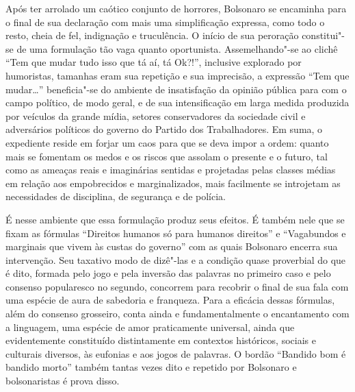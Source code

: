 Após ter arrolado um caótico conjunto de horrores, Bolsonaro se
encaminha para o final de sua declaração com mais uma simplificação
expressa, como todo o resto, cheia de fel, indignação e truculência. O
início de sua peroração constitui"-se de uma formulação tão vaga quanto
oportunista. Assemelhando"-se ao clichê ``Tem que mudar tudo isso que tá
aí, tá Ok?!'', inclusive explorado por humoristas, tamanhas eram sua
repetição e sua imprecisão, a expressão ``Tem que mudar\ldots{}''
beneficia"-se do ambiente de insatisfação da opinião pública para com o
campo político, de modo geral, e de sua intensificação em larga medida
produzida por veículos da grande mídia, setores conservadores da
sociedade civil e adversários políticos do governo do Partido dos
Trabalhadores. Em suma, o expediente reside em forjar um caos para que
se deva impor a ordem: quanto mais se fomentam os medos e os riscos que
assolam o presente e o futuro, tal como as ameaças reais e imaginárias
sentidas e projetadas pelas classes médias em relação aos empobrecidos e
marginalizados, mais facilmente se introjetam as necessidades de
disciplina, de segurança e de polícia.

É nesse ambiente que essa formulação produz seus efeitos. É também nele
que se fixam as fórmulas ``Direitos humanos só para humanos direitos'' e
``Vagabundos e marginais que vivem às custas do governo'' com as quais
Bolsonaro encerra sua intervenção. Seu taxativo modo de dizê"-las e a
condição quase proverbial do que é dito, formada pelo jogo e pela
inversão das palavras no primeiro caso e pelo consenso popularesco no
segundo, concorrem para recobrir o final de sua fala com uma espécie de
aura de sabedoria e franqueza. Para a eficácia dessas fórmulas, além do
consenso grosseiro, conta ainda e fundamentalmente o encantamento com a
linguagem, uma espécie de amor praticamente universal, ainda que
evidentemente constituído distintamente em contextos históricos, sociais
e culturais diversos, às eufonias e aos jogos de palavras. O bordão
``Bandido bom é bandido morto'' também tantas vezes dito e repetido por
Bolsonaro e bolsonaristas é prova disso.

